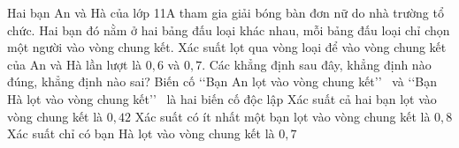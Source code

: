 \begin{ex}%
 Hai bạn An và Hà của lớp 11A tham gia giải bóng bàn đơn nữ do nhà trường tổ chức. Hai bạn đó nằm ở hai bảng đấu loại khác nhau, mỗi bảng đấu loại chỉ chọn một người vào vòng chung kết. Xác suất lọt qua vòng loại để vào vòng  chung kết của An và Hà lần lượt là $0{,}6$ và $0{,}7$. Các khẳng định sau đây, khẳng định nào đúng, khẳng định nào sai?
  \choiceTF
  {\True Biến cố  \lq\lq Bạn An lọt vào vòng chung kết\rq\rq~ và \lq\lq Bạn Hà lọt vào vòng chung kết\rq\rq~ là hai biến cố độc lập}
  {\True Xác suất cả hai bạn  lọt vào vòng chung kết là $0{,}42$}
  {Xác suất có ít nhất một bạn  lọt vào vòng chung kết là $0{,}8$}
  {Xác  suất chỉ có bạn Hà lọt vào vòng chung kết là $0{,}7$}
\end{ex}

